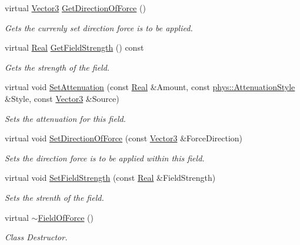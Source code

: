 \begin{DoxyCompactItemize}
virtual \hyperlink{classphys_1_1Vector3}{Vector3} \hyperlink{classphys_1_1FieldOfForce_a1c0ad14cd3b9dc76157ca50e7e26327e}{GetDirectionOfForce} ()
\begin{DoxyCompactList}\small\item\em Gets the currenly set direction force is to be applied. \item\end{DoxyCompactList}\item 
virtual \hyperlink{namespacephys_af7eb897198d265b8e868f45240230d5f}{Real} \hyperlink{classphys_1_1FieldOfForce_a28bc735f6a0b3d2e1851e66d6877a041}{GetFieldStrength} () const 
\begin{DoxyCompactList}\small\item\em Gets the strength of the field. \item\end{DoxyCompactList}\item 
virtual void \hyperlink{classphys_1_1FieldOfForce_a62c35223c61405fac5f2e3ccaf6cd3e8}{SetAttenuation} (const \hyperlink{namespacephys_af7eb897198d265b8e868f45240230d5f}{Real} \&Amount, const \hyperlink{namespacephys_ad4ce7ee5c1cc164f2ea3d5f28211739f}{phys::AttenuationStyle} \&Style, const \hyperlink{classphys_1_1Vector3}{Vector3} \&Source)
\begin{DoxyCompactList}\small\item\em Sets the attenuation for this field. \item\end{DoxyCompactList}\item 
virtual void \hyperlink{classphys_1_1FieldOfForce_a3236fd171fd1998e0f4b30e5440e88bc}{SetDirectionOfForce} (const \hyperlink{classphys_1_1Vector3}{Vector3} \&ForceDirection)
\begin{DoxyCompactList}\small\item\em Sets the direction force is to be applied within this field. \item\end{DoxyCompactList}\item 
virtual void \hyperlink{classphys_1_1FieldOfForce_ad7d83cc9b16a8a735051cf991c893d71}{SetFieldStrength} (const \hyperlink{namespacephys_af7eb897198d265b8e868f45240230d5f}{Real} \&FieldStrength)
\begin{DoxyCompactList}\small\item\em Sets the strenth of the field. \item\end{DoxyCompactList}\item 
\hypertarget{classphys_1_1FieldOfForce_a263efed38a423130a2b3271db6fcbb88}{
virtual \hyperlink{classphys_1_1FieldOfForce_a263efed38a423130a2b3271db6fcbb88}{$\sim$FieldOfForce} ()}
\label{classphys_1_1FieldOfForce_a263efed38a423130a2b3271db6fcbb88}

\begin{DoxyCompactList}\small\item\em Class Destructor. \item\end{DoxyCompactList}\end{DoxyCompactItemize}
